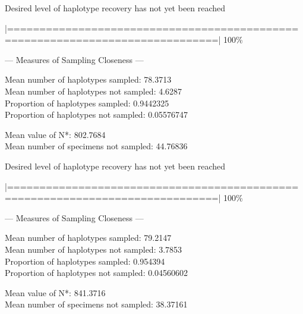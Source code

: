 {\vspace{3mm}
 
\noindent Desired level of haplotype recovery has not yet been reached 

\vspace{2mm}

\noindent |==============================================================================| 100\%

\vspace{3mm}

\noindent --- Measures of Sampling Closeness ---

\vspace{2mm} 
 
\noindent Mean number of haplotypes sampled: 78.3713 \\
Mean number of haplotypes not sampled: 4.6287  \\
Proportion of haplotypes sampled: 0.9442325  \\
Proportion of haplotypes not sampled: 0.05576747     

\vspace{2mm} 
 
\noindent Mean value of N*: 802.7684  \\
Mean number of specimens not sampled: 44.76836

\vspace{3mm}
 
\noindent Desired level of haplotype recovery has not yet been reached

\vspace{2mm}

\noindent |==============================================================================| 100\%

\vspace{3mm}

\noindent --- Measures of Sampling Closeness ---

\vspace{2mm} 
 
\noindent Mean number of haplotypes sampled: 79.2147  \\
Mean number of haplotypes not sampled: 3.7853 \\
Proportion of haplotypes sampled: 0.954394 \\
Proportion of haplotypes not sampled: 0.04560602  

\vspace{2mm} 
 
\noindent Mean value of N*: 841.3716 \\
Mean number of specimens not sampled: 38.37161 

}
